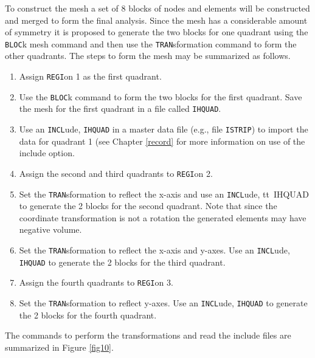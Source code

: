 To construct the mesh a set of 8 blocks of nodes and elements
will be constructed and merged to form the final analysis.  Since the mesh
has a considerable amount of symmetry it is proposed to generate the
two blocks for one quadrant using the {\tt BLOC}k mesh command
and then use  the {\tt TRAN}sformation command to form the other
quadrants.  The steps to form the mesh may be summarized as follows.
\begin{enumerate}
\item
Assign {\tt REGI}on 1 as the first quadrant.
\item
Use the {\tt BLOC}k command to form the two blocks for the first quadrant.
Save the mesh for the first quadrant in a file called {\tt IHQUAD}.
\item
Use an {\tt INCL}ude, {\tt IHQUAD} in a master data file (e.g., file
{\tt ISTRIP}) to import the data for quadrant 1 (see Chapter \ref{record}
for more information on use of the include option.
\item
Assign the second and third quadrants to {\tt REGI}on 2.
\item
Set the {\tt TRAN}sformation to reflect the x-axis and use an
{\tt INCL}ude, {tt\ IHQUAD} to generate the 2 blocks for the second
quadrant.  Note that since the coordinate transformation is not
a rotation the generated elements may have negative volume.
\item
Set the {\tt TRAN}s\-form\-a\-tion to reflect the x-axis and y-axes.
Use an {\tt INCL}\-ude, {\tt IHQUAD} to generate the 2 blocks for the third
quadrant.
\item
Assign the fourth quadrants to {\tt REGI}on 3.
\item
Set the {\tt TRAN}sformation to reflect y-axes.
Use an {\tt INCL}ude, {\tt IHQUAD} to generate the 2 blocks for the fourth
quadrant.
\end{enumerate}
The commands to perform the transformations and read the include files
are summarized in Figure \ref{fig10}.

